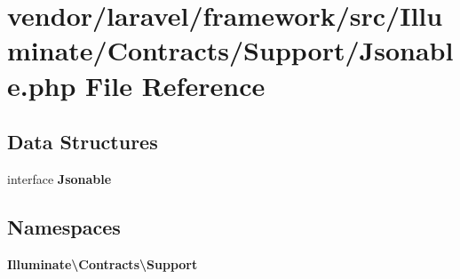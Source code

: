 \section{vendor/laravel/framework/src/\+Illuminate/\+Contracts/\+Support/\+Jsonable.php File Reference}
\label{_jsonable_8php}
\subsection*{Data Structures}
\begin{DoxyCompactItemize}
\item 
interface {\bf Jsonable}
\end{DoxyCompactItemize}
\subsection*{Namespaces}
\begin{DoxyCompactItemize}
\item 
 {\bf Illuminate\textbackslash{}\+Contracts\textbackslash{}\+Support}
\end{DoxyCompactItemize}
